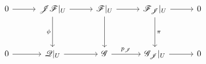 \[
\begin{tikzcd}[column sep=2.8em, row sep=3.6em]
 0 \arrow[r]
 & \mathscr J\mathscr F|_U \arrow[r] \arrow[d,"\phi"']
 & \mathscr F|_U \arrow[r] \arrow[d]
 & \mathscr F_{\mathscr J}|_U \arrow[r] \arrow[d,"\pi"]
 & 0
 \\
 0 \arrow[r]
 & \mathscr Q|_U \arrow[r]
 & \mathscr G \arrow[r,"p_{\mathscr J}"]
 & \mathscr G_{\mathscr J}|_U \arrow[r]
 & 0
\end{tikzcd}
\]
